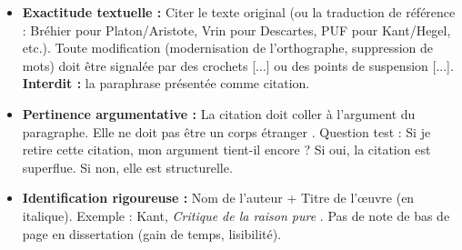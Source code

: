 \documentclass[11pt]{article}
\begin{document}
\begin{propriete}
\begin{itemize}
    \item \textbf{Exactitude textuelle :} Citer le texte original (ou la traduction de référence : Bréhier pour Platon/Aristote, Vrin pour Descartes, PUF pour Kant/Hegel, etc.). Toute modification (modernisation de l'orthographe, suppression de mots) doit être signalée par des crochets [...] ou des points de suspension [...]. \textbf{Interdit :} la paraphrase présentée comme citation.
    \item \textbf{Pertinence argumentative :} La citation doit \og coller \fg{} à l'argument du paragraphe. Elle ne doit pas être un \og corps étranger \fg{}. Question test : \og Si je retire cette citation, mon argument tient-il encore ? \fg{} Si oui, la citation est superflue. Si non, elle est structurelle.
    \item \textbf{Identification rigoureuse :} Nom de l'auteur + Titre de l'œuvre (en italique). Exemple : \og Kant, \emph{Critique de la raison pure} \fg{}. Pas de note de bas de page en dissertation (gain de temps, lisibilité).
\end{itemize}
\end{propriete}
\end{document}
